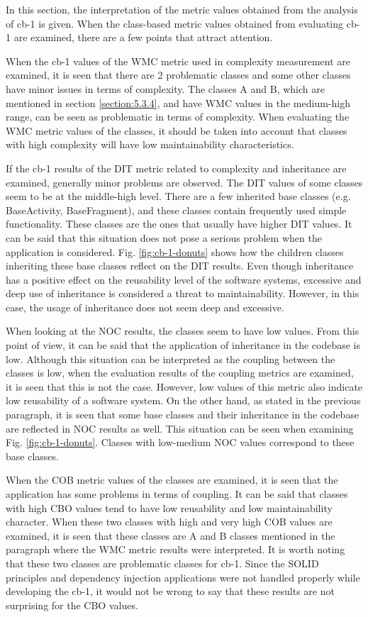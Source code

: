 In this section, the interpretation of the metric values obtained from the analysis of cb-1 is given. When the class-based metric values obtained from evaluating cb-1 are examined, there are a few points that attract attention. 

When the cb-1 values of the WMC metric used in complexity measurement are examined, it is seen that there are 2 problematic classes and some other classes have minor issues in terms of complexity. The classes A and B, which are mentioned in section \ref{section:5.3.4}, and have WMC values in the medium-high range, can be seen as problematic in terms of complexity. When evaluating the WMC metric values of the classes, it should be taken into account that classes with high complexity will have low maintainability characteristics.

If the cb-1 results of the DIT metric related to complexity and inheritance are examined, generally minor problems are observed. The DIT values of some classes seem to be at the middle-high level. There are a few inherited base classes (e.g. BaseActivity, BaseFragment), and these classes contain frequently used simple functionality. These classes are the ones that usually have higher DIT values. It can be said that this situation does not pose a serious problem when the application is considered. Fig. \ref{fig:cb-1-donuts} shows how the children classes inheriting these base classes reflect on the DIT results. Even though inheritance has a positive effect on the reusability level of the software systems, excessive and deep use of inheritance is considered a threat to maintainability. However, in this case, the usage of inheritance does not seem deep and excessive.

When looking at the NOC results, the classes seem to have low values. From this point of view, it can be said that the application of inheritance in the codebase is low. Although this situation can be interpreted as the coupling between the classes is low, when the evaluation results of the coupling metrics are examined, it is seen that this is not the case. However, low values of this metric also indicate low reusability of a software system. On the other hand, as stated in the previous paragraph, it is seen that some base classes and their inheritance in the codebase are reflected in NOC results as well. This situation can be seen when examining Fig. \ref{fig:cb-1-donuts}. Classes with low-medium NOC values correspond to these base classes.

When the COB metric values of the classes are examined, it is seen that the application has some problems in terms of coupling. It can be said that classes with high CBO values tend to have low reusability and low maintainability character. When these two classes with high and very high COB values are examined, it is seen that these classes are A and B classes mentioned in the paragraph where the WMC metric results were interpreted. It is worth noting that these two classes are problematic classes for cb-1. Since the SOLID principles and dependency injection applications were not handled properly while developing the cb-1, it would not be wrong to say that these results are not surprising for the CBO values.


